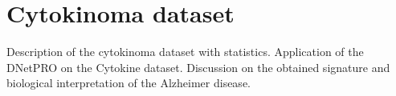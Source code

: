 \documentclass{standalone}
\begin{document}
\section[Cytokinoma Dataset]{Cytokinoma dataset}\label{cytokine}

Description of the cytokinoma dataset with statistics.
Application of the DNetPRO on the Cytokine dataset.
Discussion on the obtained signature and biological interpretation of the Alzheimer disease.
\end{document}
